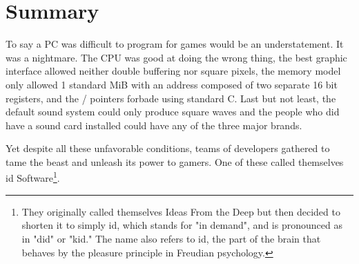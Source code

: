 \documentclass[book.tex]{subfiles}
\begin{document}
\section{Summary}
To say a PC was difficult to program for games would be an understatement. It was a nightmare. The CPU was good at doing the wrong thing, the best graphic interface allowed neither double buffering nor square pixels, the memory model only allowed 1 standard MiB with an address composed of two separate 16 bit registers, and the / pointers forbade using standard C. Last but not least, the default sound system could only produce square waves and the people who did have a sound card installed could have any of the three major brands.\\
\par
Yet despite all these unfavorable conditions, teams of developers gathered to tame the beast and unleash its power to gamers. One of these called themselves id Software\footnote{They originally called themselves Ideas From the Deep but then decided to shorten it to simply id, which stands for "in demand", and is pronounced as in "did" or "kid." The name also refers to id, the part of the brain that behaves by the pleasure principle in Freudian psychology.}.
\end{document}
